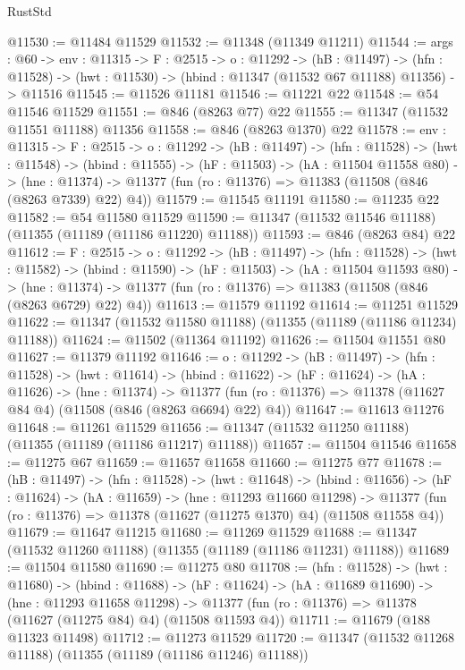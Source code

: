 \begin{lexlean}{RustStd}
\begin{coremodule}
@11530 := @11484 @11529
@11532 := @11348 (@11349 @11211)
@11544 := {args : @60} ->
  {env : @11315} ->
  {F : @2515} ->
  {o : @11292} ->
  (hB : @11497) ->
  (hfn : @11528) -> (hwt : @11530) -> (hbind : @11347 (@11532 @67 @11188) @11356) -> @11516
@11545 := @11526 @11181
@11546 := @11221 @22
@11548 := @54 @11546 @11529
@11551 := @846 (@8263 @77) @22
@11555 := @11347 (@11532 @11551 @11188) @11356
@11558 := @846 (@8263 @1370) @22
@11578 := {env : @11315} ->
  {F : @2515} ->
  {o : @11292} ->
  (hB : @11497) ->
  (hfn : @11528) ->
  (hwt : @11548) ->
  (hbind : @11555) ->
  (hF : @11503) ->
  (hA : @11504 @11558 @80) ->
  (hne : @11374) -> @11377 (fun (ro : @11376) => @11383 (@11508 (@846 (@8263 @7339) @22) @4))
@11579 := @11545 @11191
@11580 := @11235 @22
@11582 := @54 @11580 @11529
@11590 := @11347 (@11532 @11546 @11188) (@11355 (@11189 (@11186 @11220) @11188))
@11593 := @846 (@8263 @84) @22
@11612 := {F : @2515} ->
  {o : @11292} ->
  (hB : @11497) ->
  (hfn : @11528) ->
  (hwt : @11582) ->
  (hbind : @11590) ->
  (hF : @11503) ->
  (hA : @11504 @11593 @80) ->
  (hne : @11374) -> @11377 (fun (ro : @11376) => @11383 (@11508 (@846 (@8263 @6729) @22) @4))
@11613 := @11579 @11192
@11614 := @11251 @11529
@11622 := @11347 (@11532 @11580 @11188) (@11355 (@11189 (@11186 @11234) @11188))
@11624 := @11502 (@11364 @11192)
@11626 := @11504 @11551 @80
@11627 := @11379 @11192
@11646 := {o : @11292} ->
  (hB : @11497) ->
  (hfn : @11528) ->
  (hwt : @11614) ->
  (hbind : @11622) ->
  (hF : @11624) ->
  (hA : @11626) ->
  (hne : @11374) ->
  @11377 (fun (ro : @11376) => @11378 (@11627 @84 @4) (@11508 (@846 (@8263 @6694) @22) @4))
@11647 := @11613 @11276
@11648 := @11261 @11529
@11656 := @11347 (@11532 @11250 @11188) (@11355 (@11189 (@11186 @11217) @11188))
@11657 := @11504 @11546
@11658 := @11275 @67
@11659 := @11657 @11658
@11660 := @11275 @77
@11678 := (hB : @11497) ->
  (hfn : @11528) ->
  (hwt : @11648) ->
  (hbind : @11656) ->
  (hF : @11624) ->
  (hA : @11659) ->
  (hne : @11293 @11660 @11298) ->
  @11377 (fun (ro : @11376) => @11378 (@11627 (@11275 @1370) @4) (@11508 @11558 @4))
@11679 := @11647 @11215
@11680 := @11269 @11529
@11688 := @11347 (@11532 @11260 @11188) (@11355 (@11189 (@11186 @11231) @11188))
@11689 := @11504 @11580
@11690 := @11275 @80
@11708 := (hfn : @11528) ->
  (hwt : @11680) ->
  (hbind : @11688) ->
  (hF : @11624) ->
  (hA : @11689 @11690) ->
  (hne : @11293 @11658 @11298) ->
  @11377 (fun (ro : @11376) => @11378 (@11627 (@11275 @84) @4) (@11508 @11593 @4))
@11711 := @11679 (@188 @11323 @11498)
@11712 := @11273 @11529
@11720 := @11347 (@11532 @11268 @11188) (@11355 (@11189 (@11186 @11246) @11188))

\end{coremodule}
\end{lexlean}
